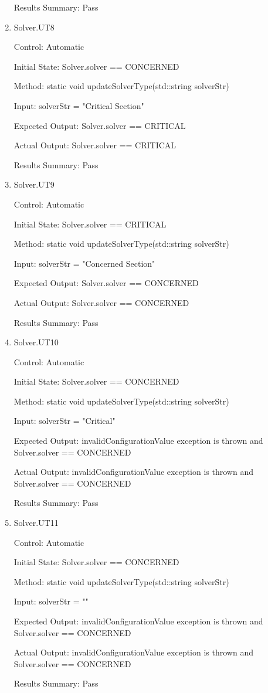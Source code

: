 \documentclass[12pt, titlepage]{article}
\begin{document}
\begin{enumerate}
    Results Summary: Pass

    \item{Solver.UT8\\}
    
    Control: Automatic

    Initial State: Solver.solver == CONCERNED
    
    Method: static void updateSolverType(std::string solverStr)
    
    Input: solverStr = "Critical Section"
    
    Expected Output: Solver.solver == CRITICAL

    Actual Output: Solver.solver == CRITICAL

    Results Summary: Pass

    \item{Solver.UT9\\}
    
    Control: Automatic

    Initial State: Solver.solver == CRITICAL
    
    Method: static void updateSolverType(std::string solverStr)
    
    Input: solverStr = "Concerned Section"
    
    Expected Output: Solver.solver == CONCERNED

    Actual Output: Solver.solver == CONCERNED

    Results Summary: Pass

    \item{Solver.UT10\\}
    
    Control: Automatic

    Initial State: Solver.solver == CONCERNED
    
    Method: static void updateSolverType(std::string solverStr)
    
    Input: solverStr = "Critical"
    
    Expected Output: invalidConfigurationValue exception is thrown and Solver.solver == CONCERNED

    Actual Output: invalidConfigurationValue exception is thrown and Solver.solver == CONCERNED

    Results Summary: Pass

    \item{Solver.UT11\\}
    
    Control: Automatic

    Initial State: Solver.solver == CONCERNED
    
    Method: static void updateSolverType(std::string solverStr)
    
    Input: solverStr = ""
    
    Expected Output: invalidConfigurationValue exception is thrown and Solver.solver == CONCERNED

    Actual Output: invalidConfigurationValue exception is thrown and Solver.solver == CONCERNED

    Results Summary: Pass

\end{enumerate}
\end{document}
